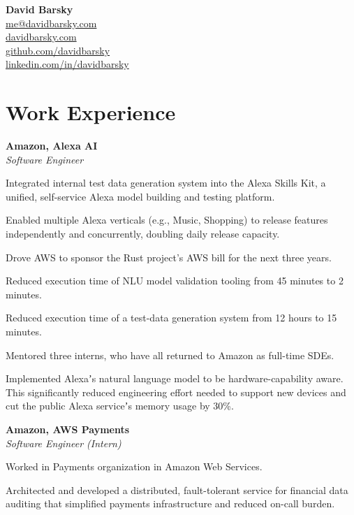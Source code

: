 \documentclass[10pt, a4paper]{article}
\newcommand{\note}[1]{\marginnote{\scriptsize #1}}
\renewenvironment{itemize}[1]{\begin{compactitem}#1}{\end{compactitem}}
\begin{document}
{\LARGE\textbf{David Barsky}}\\[.1cm]

\href{mailto:me@davidbarsky.com}{me@davidbarsky.com}\\
\href{http://davidbarsky.com}{davidbarsky.com}\\
\href{http://github.com/davidbarsky}{github.com/davidbarsky}\\
\href{http://linkedin.com/in/davidbarsky}{linkedin.com/in/davidbarsky}

\section*{\textbf{Work Experience}}

\note{Fall 2017–Present}
\textbf{Amazon, Alexa AI} \\
\emph{Software Engineer}
\begin{itemize}
	\item Integrated internal test data generation system into the Alexa Skills Kit, a unified, self-service Alexa model building and testing platform.
	\item Enabled multiple Alexa verticals (e.g., Music, Shopping) to release features independently and concurrently, doubling daily release capacity.
	\item Drove AWS to sponsor the Rust project's AWS bill for the next three years.
	\item Reduced execution time of NLU model validation tooling from 45 minutes to 2 minutes.
	\item Reduced execution time of a test-data generation system from 12 hours to 15 minutes.
	\item Mentored three interns, who have all returned to Amazon as full-time SDEs.
    \item Implemented Alexaʼs natural language model to be hardware-capability aware. This significantly reduced engineering effort needed to support new devices and cut the public Alexa serviceʼs memory usage by 30\%. 
\end{itemize}

\note{Summer 2016}
\textbf{Amazon, AWS Payments} \\
\emph{Software Engineer (Intern)}
\begin{itemize}
	\item Worked in Payments organization in Amazon Web Services.
    \item Architected and developed a distributed, fault-tolerant service for financial data auditing that simplified payments infrastructure and reduced on-call burden.
\end{itemize}
\end{document}

